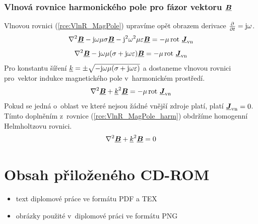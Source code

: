 \subsection*{Vlnová rovnice harmonického pole pro fázor vektoru $\mbox{\underline{\boldmath$B$}}$}
Vlnovou rovnici (\ref{rce:VlnR_MagPole}) upravíme opět obrazem derivace $\frac{\partial}{\partial t}=\mathrm{j}\omega$.
\begin{displaymath}
	\nabla^{2}\mbox{\underline{\boldmath$B$}} - \mathrm{j}\omega\mu\sigma\mbox{\underline{\boldmath$B$}} - \mathrm{j}^{2}\omega^{2}\mu\varepsilon\mbox{\underline{\boldmath$B$}} = -\mu\,\mathrm{rot}\ \mbox{\underline{\boldmath$J$}}_{\mathrm{vn}}
\end{displaymath}
\begin{displaymath}
	\nabla^{2}\mbox{\underline{\boldmath$B$}} - \mathrm{j}\omega\mu(\sigma + \mathrm{j}\omega\varepsilon)\mbox{\underline{\boldmath$B$}} = -\mu\,\mathrm{rot}\ \mbox{\underline{\boldmath$J$}}_{\mathrm{vn}}
\end{displaymath}
Pro konstantu šíření ${\underline{k}}=\pm\sqrt{-\mathrm{j}\omega\mu(\sigma+\mathrm{j}\omega\varepsilon)}$ a dostaneme vlnovou rovnici pro~vektor indukce magnetického pole v~harmonickém prostředí.
\begin{equation}
	\nabla^{2}\mbox{\underline{\boldmath$B$}} +{\underline{k}}^{2}\mbox{\underline{\boldmath$B$}} = -\mu\,\mathrm{rot}\ \mbox{\underline{\boldmath$J$}}_{\mathrm{vn}}
	\label{rce:VlnR_MagPole_harm} 
\end{equation}
Pokud se jedná o~oblast ve které nejsou žádné vnější zdroje platí, platí $\mbox{\underline{\boldmath$J$}}_{\mathrm{vn}} = 0$. Tímto doplněním z~rovnice  (\ref{rce:VlnR_MagPole_harm}) obdržíme homogenní Helmholtzovu rovnici.
\begin{equation}
	\nabla^{2}\mbox{\underline{\boldmath$B$}} +{\underline{k}}^{2}\mbox{\underline{\boldmath$B$}} = 0
	\label{rce:VlnR_MagPole_harm_BezZdroju} 
\end{equation}

\chapter{Obsah přiloženého CD-ROM} \label{kap:Obsah_CD}
\begin{itemize}
\item text diplomové práce ve formátu PDF a TEX
\item obrázky použité v~diplomové práci ve formátu PNG
\end{itemize}
